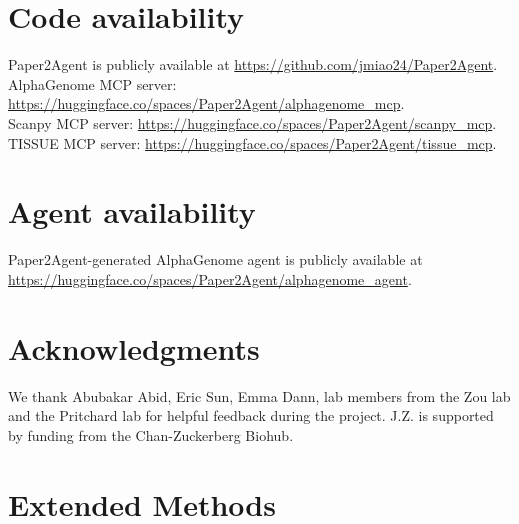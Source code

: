 \documentclass[11pt]{article}
\begin{document}
\section*{Code availability}

Paper2Agent is publicly available at \url{https://github.com/jmiao24/Paper2Agent}.\\
AlphaGenome MCP server: \url{https://huggingface.co/spaces/Paper2Agent/alphagenome_mcp}.\\
Scanpy MCP server: \url{https://huggingface.co/spaces/Paper2Agent/scanpy_mcp}.\\
TISSUE MCP server: \url{https://huggingface.co/spaces/Paper2Agent/tissue_mcp}.

\section*{Agent availability}
Paper2Agent-generated AlphaGenome agent is publicly available at \url{https://huggingface.co/spaces/Paper2Agent/alphagenome_agent}.

\section*{Acknowledgments} We thank Abubakar Abid, Eric Sun, Emma Dann, lab members from the Zou lab and the Pritchard lab for helpful feedback during the project. J.Z. is supported by funding from the Chan-Zuckerberg Biohub.





\newpage
\section*{Extended Methods}
\end{document}

